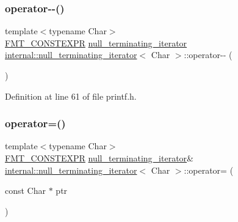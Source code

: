 \mbox{\label{classinternal_1_1null__terminating__iterator_a3635562aa50b018be443691e1bc0799a}} 
\subsubsection{\texorpdfstring{operator-\/-\/()}{operator--()}}
{\footnotesize\ttfamily template$<$typename Char$>$ \\
\hyperlink{core_8h_a69201cb276383873487bf68b4ef8b4cd}{F\+M\+T\+\_\+\+C\+O\+N\+S\+T\+E\+X\+PR} \hyperlink{classinternal_1_1null__terminating__iterator}{null\+\_\+terminating\+\_\+iterator} \hyperlink{classinternal_1_1null__terminating__iterator}{internal\+::null\+\_\+terminating\+\_\+iterator}$<$ Char $>$\+::operator-\/-\/ (\begin{DoxyParamCaption}{ }\end{DoxyParamCaption})\hspace{0.3cm}{\ttfamily [inline]}}



Definition at line 61 of file printf.\+h.

\mbox{\label{classinternal_1_1null__terminating__iterator_a91b88c0a6cbe8b2857227e0536153324}} 
\subsubsection{\texorpdfstring{operator=()}{operator=()}}
{\footnotesize\ttfamily template$<$typename Char$>$ \\
\hyperlink{core_8h_a69201cb276383873487bf68b4ef8b4cd}{F\+M\+T\+\_\+\+C\+O\+N\+S\+T\+E\+X\+PR} \hyperlink{classinternal_1_1null__terminating__iterator}{null\+\_\+terminating\+\_\+iterator}\& \hyperlink{classinternal_1_1null__terminating__iterator}{internal\+::null\+\_\+terminating\+\_\+iterator}$<$ Char $>$\+::operator= (\begin{DoxyParamCaption}\item[{const Char $\ast$}]{ptr }\end{DoxyParamCaption})\hspace{0.3cm}{\ttfamily [inline]}}



